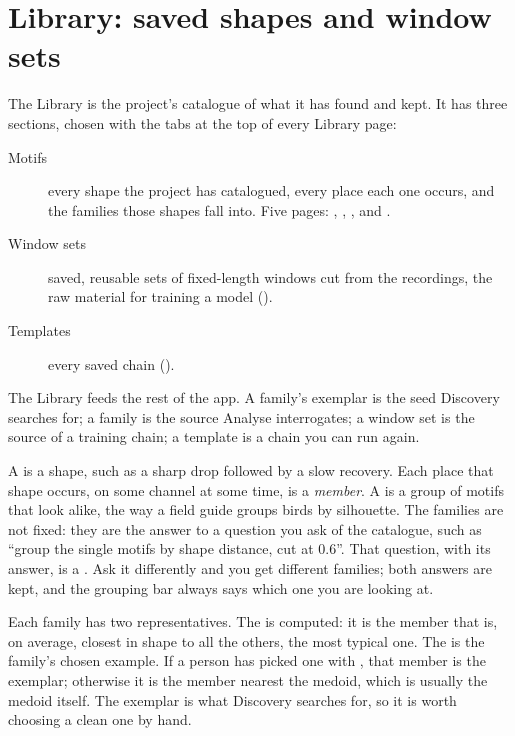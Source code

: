 \chapter{Library: saved shapes and window sets}\label{ch:library}
The Library is the project's catalogue of what it has found and kept. It has three sections,
chosen with the tabs at the top of every Library page:
\begin{description}
  \item[Motifs] every shape the project has catalogued, every place each one occurs, and the
    families those shapes fall into. Five pages: ,
    , ,  and
    .
  \item[Window sets] saved, reusable sets of fixed-length windows cut from the recordings, the
    raw material for training a model ().
  \item[Templates] every saved chain ().
\end{description}
The Library feeds the rest of the app. A family's exemplar is the seed Discovery searches
for; a family is the source Analyse interrogates; a window set is the source of a training
chain; a template is a chain you can run again.

\begin{plainterms}
A  is a shape, such as a sharp drop followed by a slow recovery. Each place
that shape occurs, on some channel at some time, is a \emph{member}. A 
is a group of motifs that look alike, the way a field guide groups birds by silhouette. The
families are not fixed: they are the answer to a question you ask of the catalogue, such as
``group the single motifs by shape distance, cut at 0.6''. That question, with its answer, is
a . Ask it differently and you get different families; both answers
are kept, and the grouping bar always says which one you are looking at.
\end{plainterms}

\begin{plainterms}
Each family has two representatives. The  is computed: it is the member
that is, on average, closest in shape to all the others, the most typical one. The
 is the family's chosen example. If a person has picked one with
, that member is the exemplar; otherwise it is the member nearest the
medoid, which is usually the medoid itself. The exemplar is what Discovery searches for, so it
is worth choosing a clean one by hand.
\end{plainterms}

